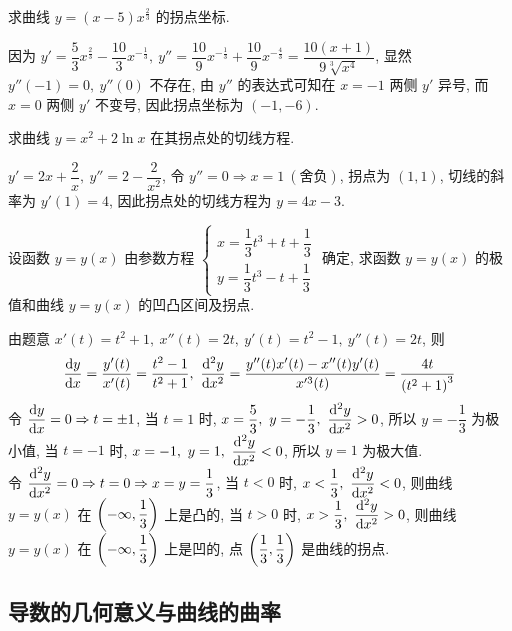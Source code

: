 \begin{example}[2008 数二]
    求曲线 $y=(x-5)x^{\frac{2}{3}}$ 的拐点坐标.
\end{example}
\begin{solution}
    因为 $y'=\dfrac{5}{3}x^{\frac{2}{3}}-\dfrac{10}{3}x^{-\frac{1}{3}},~y''=\dfrac{10}{9}x^{-\frac{1}{3}}+\dfrac{10}{9}x^{-\frac{4}{3}}=\dfrac{10(x+1)}{9\sqrt[3]{x^4}}$, 显然 $y''(-1)=0,~y''(0)$ 不存在, 由 $y''$ 的表达式可知在 $x=-1$ 两侧 $y'$ 异号, 而 $x=0$ 两侧 $y'$ 不变号, 因此拐点坐标为 $(-1,-6).$
\end{solution}

\begin{example}[2018 数二]
    求曲线 $y=x^2+2\ln x$ 在其拐点处的切线方程.
\end{example}
\begin{solution}
    $y'=2x+\dfrac{2}{x},~y''=2-\dfrac{2}{x^2}$, 令 $y''=0\Rightarrow x=1~(\text{舍负})$, 拐点为 $(1,1)$, 切线的斜率为 $y'(1)=4$, 因此拐点处的切线方程为 $y=4x-3.$
\end{solution}

\begin{example}[2011 数二]
    设函数 $y=y(x)$ 由参数方程 $\begin{cases}
        x=\dfrac{1}{3}t^3+t+\dfrac{1}{3}\\[6pt]
        y=\dfrac{1}{3}t^3-t+\dfrac{1}{3}
    \end{cases}$ 确定, 求函数 $y=y(x)$ 的极值和曲线 $y=y(x)$ 的凹凸区间及拐点.
\end{example}
\begin{solution}
    由题意 $x'(t)=t^2+1,~x''(t)=2t,~y'(t)=t^2-1,~y''(t)=2t$, 则 
    $$\dv{y}{x}=\dfrac{y'(t)}{x'(t)}=\dfrac{t^2-1}{t^2+1},~\dv[2]{y}{x}=\dfrac{y''(t)x'(t)-x''(t)y'(t)}{x'^3(t)}=\dfrac{4t}{\qty(t^2+1)^3}$$
    令 $\displaystyle\dv{y}{x}=0\Rightarrow t=\pm 1$, 当 $t=1$ 时, $\displaystyle x=\dfrac{5}{3},~y=-\dfrac{1}{3},~\dv[2]{y}{x}>0$, 所以 $y=-\dfrac{1}{3}$ 为极小值, 
    当 $t=-1$ 时, $x=-1,~y=1,~\displaystyle\dv[2]{y}{x}<0$, 所以 $y=1$ 为极大值.\\
    令 $\displaystyle\dv[2]{y}{x}=0\Rightarrow t=0\Rightarrow x=y=\dfrac{1}{3}$, 当 $t<0$ 时, $x<\dfrac{1}{3},~\displaystyle \dv[2]{y}{x}<0$, 则曲线 $y=y(x)$ 在 $\qty(-\infty,\dfrac{1}{3})$ 上是凸的, 
    当 $t>0$ 时, $x>\dfrac{1}{3},~\displaystyle\dv[2]{y}{x}>0$, 则曲线 $y=y(x)$ 在 $\qty(-\infty,\dfrac{1}{3})$ 上是凹的, 点 $\qty(\dfrac{1}{3},\dfrac{1}{3})$ 是曲线的拐点.
\end{solution}

\subsection{导数的几何意义与曲线的曲率}

